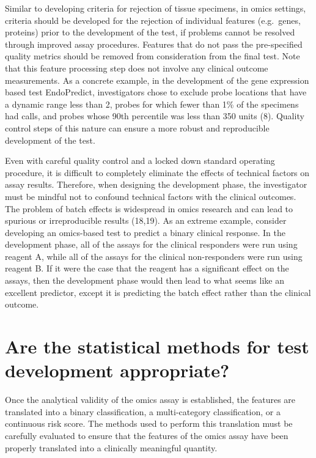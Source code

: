 \documentclass[11pt]{article}
\begin{document}
Similar to developing criteria for rejection of tissue specimens, in
omics settings, criteria should be developed for the rejection of
individual features (e.g.~genes, proteins) prior to the development of
the test, if problems cannot be resolved through improved assay
procedures. Features that do not pass the pre-specified quality metrics
should be removed from consideration from the final test. Note that this
feature processing step does not involve any clinical outcome
measurements. As a concrete example, in the development of the gene
expression based test EndoPredict, investigators chose to exclude probe
locations that have a dynamic range less than 2, probes for which fewer
than 1\% of the specimens had calls, and probes whose 90th percentile
was less than 350 units (8). Quality control steps of this nature can
ensure a more robust and reproducible development of the test.

Even with careful quality control and a locked down standard operating
procedure, it is difficult to completely eliminate the effects of
technical factors on assay results. Therefore, when designing the
development phase, the investigator must be mindful not to confound
technical factors with the clinical outcomes. The problem of batch
effects is widespread in omics research and can lead to spurious or
irreproducible results (18,19). As an extreme example, consider
developing an omics-based test to predict a binary clinical response. In
the development phase, all of the assays for the clinical responders
were run using reagent A, while all of the assays for the clinical
non-responders were run using reagent B. If it were the case that the
reagent has a significant effect on the assays, then the development
phase would then lead to what seems like an excellent predictor, except
it is predicting the batch effect rather than the clinical outcome.

\section{Are the statistical methods for test development
appropriate?}\label{are-the-statistical-methods-for-test-development-appropriate}

Once the analytical validity of the omics assay is established, the
features are translated into a binary classification, a multi-category
classification, or a continuous risk score. The methods used to perform
this translation must be carefully evaluated to ensure that the features
of the omics assay have been properly translated into a clinically
meaningful quantity.
\end{document}
